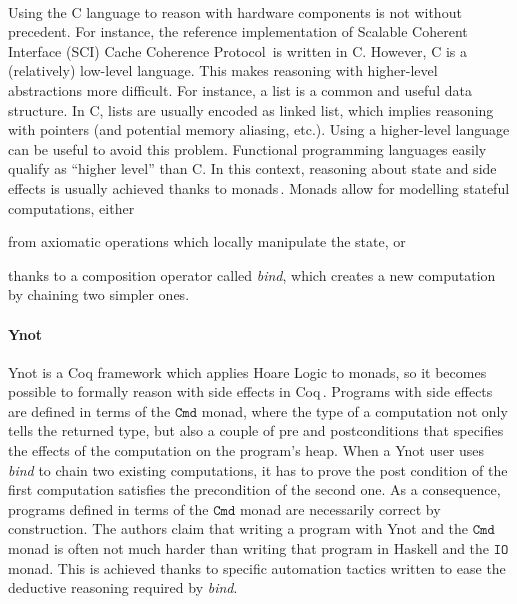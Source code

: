 \paragraph{}
%
Using the C language to reason with hardware components is not without
precedent.
%
For instance, the reference implementation of Scalable Coherent Interface (SCI)
Cache Coherence Protocol\,\cite{stern1995cachecoherence} is written in C.
%
However, C is a (relatively) low-level language.
%
This makes reasoning with higher-level abstractions more difficult.
%
For instance, a list is a common and useful data structure.
%
In C, lists are usually encoded as linked list, which implies reasoning with
pointers (and potential memory aliasing, etc.).
%
Using a higher-level language can be useful to avoid this problem.
%
Functional programming languages easily qualify as ``higher level'' than C.
%
In this context, reasoning about state and side effects is usually achieved
thanks to monads\,\cite{jones2005io}.
%
Monads allow for modelling stateful computations, either \begin{inparaenum}[(1)]
%
\item from axiomatic operations which locally manipulate the state, or
%
\item thanks to a composition operator called \emph{bind}, which creates a new
  computation by chaining two simpler ones.
%
\end{inparaenum}

\paragraph{Ynot}
%
Ynot is a Coq framework which applies Hoare Logic to monads, so it becomes
possible to formally reason with side effects in Coq\,\cite{chlipala2009ynot}.
%
Programs with side effects are defined in terms of the $\mathtt{Cmd}$ monad,
where the type of a computation not only tells the returned type, but also a
couple of pre and postconditions that specifies the effects of the computation
on the program's heap.
%
When a Ynot user uses \emph{bind} to chain two existing computations, it has to
prove the post condition of the first computation satisfies the precondition
of the second one.
%
As a consequence, programs defined in terms of the $\mathtt{Cmd}$ monad are
necessarily correct by construction.
%
The authors claim that writing a program with Ynot and the $\mathtt{Cmd}$ monad is
often not much harder than writing that program in Haskell and the $\mathtt{IO}$
monad.
%
This is achieved thanks to specific automation tactics written to ease the
deductive reasoning required by \emph{bind}.

